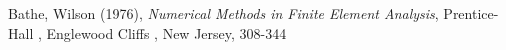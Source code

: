\begin{thebibliography}{9}
	Bathe, Wilson (1976),
	\emph{Numerical Methods in Finite Element Analysis}, Prentice-Hall , Englewood Cliffs , New Jersey, 308-344 
\end{thebibliography}
